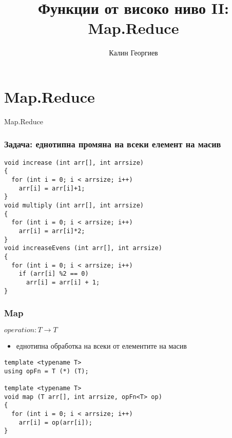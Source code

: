\documentclass{beamer}
\begin{document}
\title[Обектно ориентирано програмиране]{Функции от високо ниво II: Map.Reduce} 
\author{Калин Георгиев} 
\frame{\titlepage} 


\section{Map.Reduce} 

\begin{frame}
\centerline{Map.Reduce}
\end{frame}

\begin{frame}[fragile]
\frametitle{Задача: еднотипна промяна на всеки елемент на масив}

\begin{flushleft}
\begin{lstlisting}
void increase (int arr[], int arrsize)
{
  for (int i = 0; i < arrsize; i++)
    arr[i] = arr[i]+1;
}
void multiply (int arr[], int arrsize)
{
  for (int i = 0; i < arrsize; i++)
    arr[i] = arr[i]*2;
}
void increaseEvens (int arr[], int arrsize)
{
  for (int i = 0; i < arrsize; i++)
    if (arr[i] %2 == 0)
      arr[i] = arr[i] + 1;
}
\end{lstlisting}  
\end{flushleft}

  
\end{frame}


\begin{frame}[fragile]
\frametitle{Map}

\begin{center}
$operation: T \rightarrow T$
\end{center}

\begin{itemize}
  \item еднотипна обработка на всеки от елементите на масив
\end{itemize}

\begin{flushleft}
\begin{lstlisting}
template <typename T>
using opFn = T (*) (T);

template <typename T>
void map (T arr[], int arrsize, opFn<T> op)
{
  for (int i = 0; i < arrsize; i++)
    arr[i] = op(arr[i]);
}
\end{lstlisting}  
\end{flushleft}

  
\end{frame}
\end{document}
